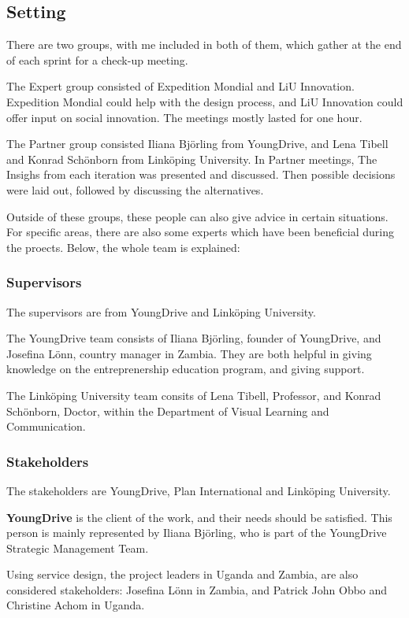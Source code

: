 \subsection{Setting}

There are two groups, with me included in both of them, which gather at the end of each sprint for a check-up meeting.

The Expert group consisted of Expedition Mondial and LiU Innovation. Expedition Mondial could help with the design process, and LiU Innovation could offer input on social innovation. The meetings mostly lasted for one hour.

The Partner group consisted Iliana Björling from YoungDrive, and Lena Tibell and Konrad Schönborn from Linköping University. In Partner meetings, The Insighs from each iteration was presented and discussed. Then possible decisions were laid out, followed by discussing the alternatives. %

Outside of these groups, these people can also give advice in certain situations. For specific areas, there are also some experts which have been beneficial during the proects. Below, the whole team is explained:

\subsubsection{Supervisors}
The supervisors are from YoungDrive and Linköping University.

The YoungDrive team consists of Iliana Björling, founder of YoungDrive, and Josefina Lönn, country manager in Zambia. They are both helpful in giving knowledge on the entreprenership education program, and giving support.

The Linköping University team consits of Lena Tibell, Professor, and Konrad Schönborn, Doctor, within the Department of Visual Learning and Communication.

\subsubsection{Stakeholders}
The stakeholders are YoungDrive, Plan International and Linköping University.

\textbf{YoungDrive} is the client of the work, and their needs should be satisfied. This person is mainly represented by Iliana Björling, who is part of the YoungDrive Strategic Management Team.

Using service design, the project leaders in Uganda and Zambia, are also considered stakeholders: Josefina Lönn in Zambia, and Patrick John Obbo and Christine Achom in Uganda.

